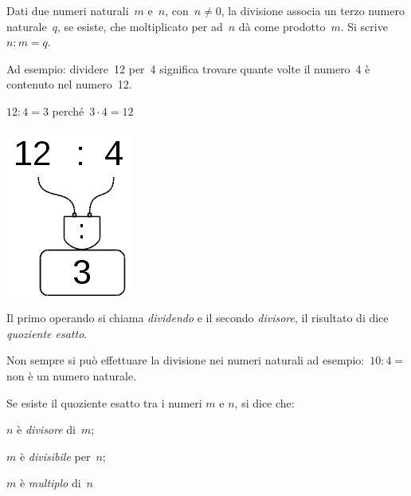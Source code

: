 \begin{definizione}
Dati due numeri naturali~\(m\) e~\(n\), con~\(n \neq 0\), la divisione associa 
un terzo numero naturale~\(q\), se esiste, che moltiplicato per ad~\(n\) dà 
come prodotto~\(m\).
Si scrive~\(n : m = q\).
\end{definizione}

Ad esempio: dividere~12 per~4 significa trovare quante volte il numero~4 è 
contenuto nel numero~12.

\begin{minipage}{0.80\textwidth}
 \centering
 \(12 : 4 = 3\) perché~\(3 \cdot 4 = 12\)

% 
\end{minipage}%
\begin{minipage}{0.15\textwidth}
 \centering
\begin{inaccessibleblock}[]
 \includegraphics[scale=0.35]{img/op_div.png}
\end{inaccessibleblock}
\end{minipage}%

Il primo operando si chiama \emph{dividendo} e il secondo \emph{divisore}, 
il risultato di dice \emph{quoziente esatto}.

Non sempre si può effettuare la divisione nei numeri naturali ad 
esempio:~\(10 : 4 =\) non è un numero naturale.

Se esiste il quoziente esatto tra i numeri \(m\) e \(n\), si dice che:

\begin{itemize*}
 \item \(n\) è \emph{divisore} di~\(m\);
 \item \(m\) è \emph{divisibile} per~\(n\);
 \item \(m\) è \emph{multiplo} di~\(n\)
\end{itemize*}


